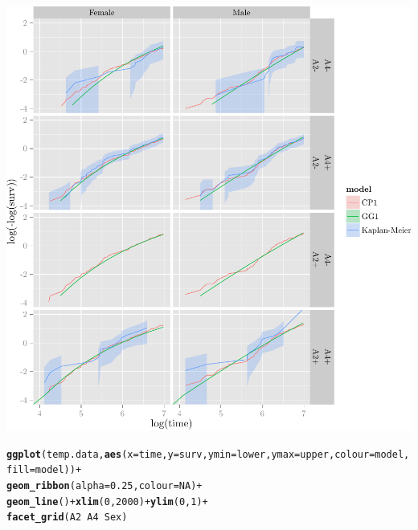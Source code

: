 \documentclass{article}\usepackage[]{graphicx}\usepackage[]{color}
\makeatletter
\def\maxwidth{ %
  \ifdim\Gin@nat@width>\linewidth
    \linewidth
  \else
    \Gin@nat@width
  \fi
}
\newcommand{\hlnum}[1]{\textcolor[rgb]{0.686,0.059,0.569}{#1}}%
\newcommand{\hlopt}[1]{\textcolor[rgb]{0,0,0}{#1}}%
\newcommand{\hlstd}[1]{\textcolor[rgb]{0.345,0.345,0.345}{#1}}%
\newcommand{\hlkwc}[1]{\textcolor[rgb]{0.333,0.667,0.333}{#1}}%
\newcommand{\hlkwd}[1]{\textcolor[rgb]{0.737,0.353,0.396}{\textbf{#1}}}%
\newenvironment{kframe}{%
 \def\at@end@of@kframe{}%
 \ifinner\ifhmode%
  \def\at@end@of@kframe{\end{minipage}}%
  \begin{minipage}{\columnwidth}%
 \fi\fi%
 \def\FrameCommand##1{\hskip\@totalleftmargin \hskip-\fboxsep
 \colorbox{shadecolor}{##1}\hskip-\fboxsep
     \hskip-\linewidth \hskip-\@totalleftmargin \hskip\columnwidth}%
 \MakeFramed {\advance\hsize-\width
   \@totalleftmargin\z@ \linewidth\hsize
   \@setminipage}}%
 {\par\unskip\endMakeFramed%
 \at@end@of@kframe}
\newenvironment{knitrout}{}{} %
\makeatother
\begin{document}
\begin{knitrout}
\begin{kframe}
{\ttfamily\noindent\color{warningcolor}{\#\# Warning: Removed 40 rows containing missing values (geom\_path).}}

{\ttfamily\noindent\color{warningcolor}{\#\# Warning: Removed 38 rows containing missing values (geom\_path).}}\end{kframe}

{\centering \includegraphics[width=\maxwidth]{figure/05-final-fit-assessment-4-1} 

}


\begin{kframe}\begin{alltt}
\hlkwd{ggplot}\hlstd{(temp.data,} \hlkwd{aes}\hlstd{(}\hlkwc{x} \hlstd{= time,} \hlkwc{y} \hlstd{= surv,} \hlkwc{ymin} \hlstd{= lower,} \hlkwc{ymax} \hlstd{= upper,} \hlkwc{colour} \hlstd{= model,} \hlkwc{fill} \hlstd{= model))} \hlopt{+}
        \hlkwd{geom_ribbon}\hlstd{(}\hlkwc{alpha} \hlstd{=} \hlnum{0.25}\hlstd{,} \hlkwc{colour} \hlstd{=} \hlnum{NA}\hlstd{)} \hlopt{+}
        \hlkwd{geom_line}\hlstd{()} \hlopt{+} \hlkwd{xlim}\hlstd{(}\hlnum{0}\hlstd{,} \hlnum{2000}\hlstd{)} \hlopt{+} \hlkwd{ylim}\hlstd{(}\hlnum{0}\hlstd{,} \hlnum{1}\hlstd{)} \hlopt{+}
        \hlkwd{facet_grid}\hlstd{(A2} \hlopt{~} \hlstd{A4} \hlopt{~} \hlstd{Sex)}
\end{alltt}



\end{kframe}
\end{knitrout}
\end{document}
